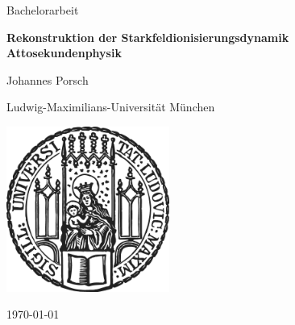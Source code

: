\begin{titlepage}
    \centering
    
    {\Large Bachelorarbeit}
    
    \vspace{1.5cm}
    
    {\huge\bfseries Rekonstruktion der Starkfeldionisierungsdynamik\\[0.4cm]
    \Large Attosekundenphysik}
    
    \vspace{2cm}
    
    {\Large Johannes Porsch}
    
    \vspace{2cm}
    
    {\Large Ludwig-Maximilians-Universität München}
    
    \vfill
    
    \includegraphics[width = 0.4\textwidth]{figures/sigillum.png}

    \vfill
    
    {\Large \today}
    
\end{titlepage}